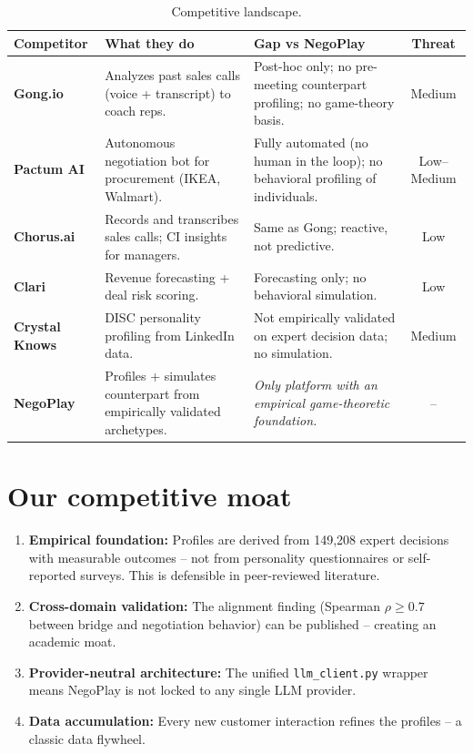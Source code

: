 \documentclass[11pt, a4paper, oneside]{report}
\begin{document}
\begin{table}[H]
\centering\small
\caption{Competitive landscape.}
\begin{tabularx}{\textwidth}{l X X c}
\toprule
\textbf{Competitor} & \textbf{What they do} & \textbf{Gap vs NegoPlay} & \textbf{Threat} \\
\midrule
\textbf{Gong.io}
  & Analyzes past sales calls (voice + transcript) to coach reps.
  & Post-hoc only; no pre-meeting counterpart profiling; no game-theory basis.
  & Medium \\
\textbf{Pactum AI}
  & Autonomous negotiation bot for procurement (IKEA, Walmart).
  & Fully automated (no human in the loop); no behavioral profiling of individuals.
  & Low--Medium \\
\textbf{Chorus.ai}
  & Records and transcribes sales calls; CI insights for managers.
  & Same as Gong; reactive, not predictive.
  & Low \\
\textbf{Clari}
  & Revenue forecasting + deal risk scoring.
  & Forecasting only; no behavioral simulation.
  & Low \\
\textbf{Crystal Knows}
  & DISC personality profiling from LinkedIn data.
  & Not empirically validated on expert decision data; no simulation.
  & Medium \\
\midrule
\textbf{NegoPlay}
  & Profiles + simulates counterpart from empirically validated archetypes.
  & \emph{Only platform with an empirical game-theoretic foundation.}
  & -- \\
\bottomrule
\end{tabularx}
\end{table}

\section{Our competitive moat}

\begin{enumerate}[leftmargin=*]
    \item \textbf{Empirical foundation:} Profiles are derived from 149{,}208 expert
          decisions with measurable outcomes -- not from personality questionnaires
          or self-reported surveys. This is defensible in peer-reviewed literature.
    \item \textbf{Cross-domain validation:} The alignment finding (Spearman
          $\rho \geq 0.7$ between bridge and negotiation behavior) can be
          published -- creating an academic moat.
    \item \textbf{Provider-neutral architecture:} The unified \texttt{llm\_client.py}
          wrapper means NegoPlay is not locked to any single LLM provider.
    \item \textbf{Data accumulation:} Every new customer interaction refines the
          profiles -- a classic data flywheel.
\end{enumerate}
\end{document}
